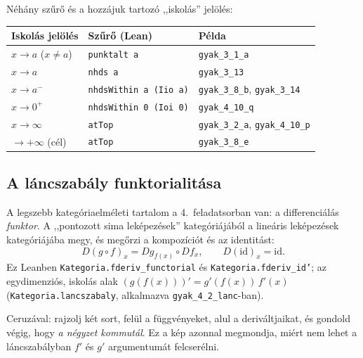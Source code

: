 \documentclass[11pt,a4paper]{article}
\newcommand{\lean}[1]{\texttt{\small #1}}
\newcommand{\R}{\mathbb{R}}
\theoremstyle{definition}
\begin{document}
\noindent
Néhány szűrő és a hozzájuk tartozó ,,iskolás'' jelölés:
\begin{center}
\begin{tabular}{@{}lll@{}}
\toprule
Iskolás jelölés & Szűrő (Lean) & Példa \\
\midrule
$x\to a$ ($x\ne a$) & \lean{punktalt a} & \lean{gyak\_3\_1\_a} \\
$x\to a$ & \lean{nhds a} & \lean{gyak\_3\_13} \\
$x\to a^-$ & \lean{nhdsWithin a (Iio a)} & \lean{gyak\_3\_8\_b}, \lean{gyak\_3\_14} \\
$x\to 0^+$ & \lean{nhdsWithin 0 (Ioi 0)} & \lean{gyak\_4\_10\_q} \\
$x\to\infty$ & \lean{atTop} & \lean{gyak\_3\_2\_a}, \lean{gyak\_4\_10\_p} \\
$\to+\infty$ (cél) & \lean{atTop} & \lean{gyak\_3\_8\_e} \\
\bottomrule
\end{tabular}
\end{center}

\subsection{A láncszabály funktorialitása}

A legszebb kategóriaelméleti tartalom a 4.~feladatsorban van: a differenciálás
\emph{funktor}. A ,,pontozott sima leképezések'' kategóriájából a
lineáris leképezések kategóriájába megy, és megőrzi a kompozíciót és az identitást:
\[
  D(g\circ f)_x = D g_{f(x)} \circ Df_x, \qquad D(\mathrm{id})_x = \mathrm{id}.
\]
Ez Leanben \lean{Kategoria.fderiv\_functorial} és \lean{Kategoria.fderiv\_id'};
az egydimenziós, iskolás alak $\left(g(f(x))\right)' = g'(f(x))\,f'(x)$
(\lean{Kategoria.lancszabaly}, alkalmazva \lean{gyak\_4\_2\_lanc}-ban).

\begin{center}
\end{center}
\noindent
Ceruzával: rajzolj két sort, felül a függvényeket, alul a deriváltjaikat, és
gondold végig, hogy \emph{a négyzet kommutál}. Ez a kép azonnal megmondja,
miért nem lehet a láncszabályban $f'$ és $g'$ argumentumát felcserélni.
\end{document}
